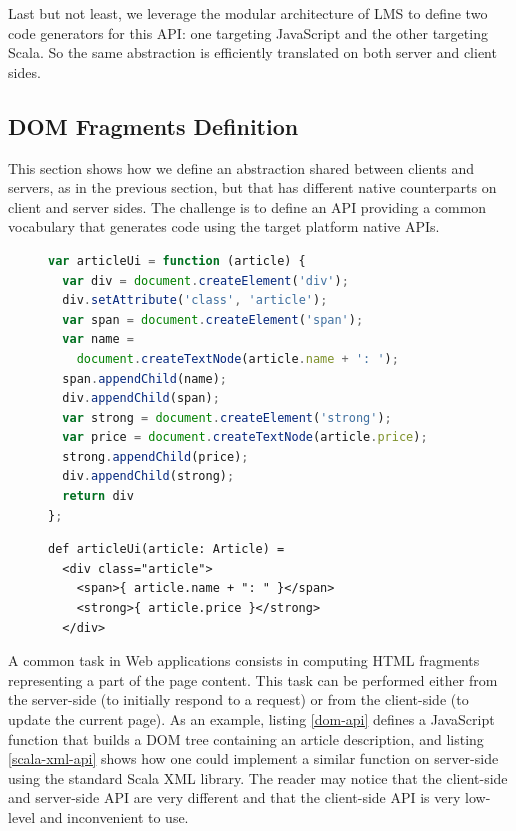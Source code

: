 \documentclass[preprint]{sigplanconf}
\begin{document}
Last but not least, we leverage the modular architecture of LMS to define two code generators for this API: one
targeting JavaScript and the other targeting Scala. So the same abstraction is efficiently translated on both server
and client sides.

\subsection{DOM Fragments Definition}

This section shows how we define an abstraction shared between clients and servers, as in the previous section, but
that has different native counterparts on client and server sides. The challenge is to define an API providing a
common vocabulary that generates code using the target platform native APIs.

\begin{figure}
\begin{lstlisting}[language=JavaScript,caption=JavaScript DOM API,label=dom-api]
var articleUi = function (article) {
  var div = document.createElement('div');
  div.setAttribute('class', 'article');
  var span = document.createElement('span');
  var name =
    document.createTextNode(article.name + ': ');
  span.appendChild(name);
  div.appendChild(span);
  var strong = document.createElement('strong');
  var price = document.createTextNode(article.price);
  strong.appendChild(price);
  div.appendChild(strong);
  return div
};
\end{lstlisting}
\end{figure}

\begin{figure}
\begin{lstlisting}[caption=Scala XML API,label=scala-xml-api]
def articleUi(article: Article) =
  <div class="article">
    <span>{ article.name + ": " }</span>
    <strong>{ article.price }</strong>
  </div>
\end{lstlisting}
\end{figure}

A common task in Web applications consists in computing HTML fragments representing a part of the page content. This
task can be performed either from the server-side (to initially respond to a request) or from the client-side (to
update the current page). As an example, listing \ref{dom-api} defines a JavaScript function  that
builds a DOM tree containing an article description, and listing \ref{scala-xml-api} shows how one could implement
a similar function on server-side using the standard Scala XML library. The reader may notice that the client-side
and server-side API are very different and that the client-side API is very low-level and inconvenient to use.
\end{document}
